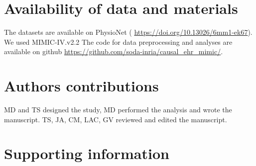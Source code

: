 \documentclass[10pt,letterpaper]{article}
\begin{document}
\section*{Availability of data and materials}

The datasets are available on PhysioNet (
\url{https://doi.org/10.13026/6mm1-ek67}). We used MIMIC-IV.v2.2 The code for
data preprocessing and analyses are available on github
\url{https://github.com/soda-inria/causal_ehr_mimic/}.


\section*{Authors contributions}

MD and TS designed the study, MD performed the analysis and wrote the manuscript.
TS, JA, CM, LAC, GV reviewed and edited the manuscript.



\section*{Supporting information}

\end{document}
